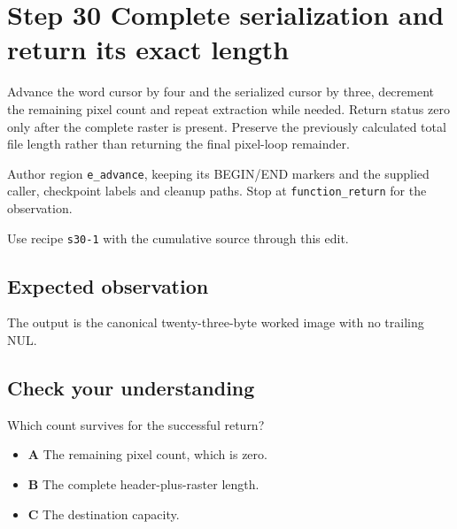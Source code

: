 \section{Step 30 Complete serialization and return its exact length}\label{ppm-s30}

Advance the word cursor by four and the serialized cursor by three, decrement the remaining pixel count and repeat extraction while needed. Return status zero only after the complete raster is present. Preserve the previously calculated total file length rather than returning the final pixel-loop remainder.

Author region \texttt{e\_advance}, keeping its BEGIN/END markers and the supplied caller, checkpoint labels and cleanup paths. Stop at \texttt{function\_return} for the observation.

Use recipe \texttt{s30-1} with the cumulative source through this edit.

\subsection{Expected observation}
The output is the canonical twenty-three-byte worked image with no trailing NUL.

\subsection{Check your understanding}
Which count survives for the successful return?

\begin{itemize}
\item \textbf{A} The remaining pixel count, which is zero.
\item \textbf{B} The complete header-plus-raster length.
\item \textbf{C} The destination capacity.
\end{itemize}
